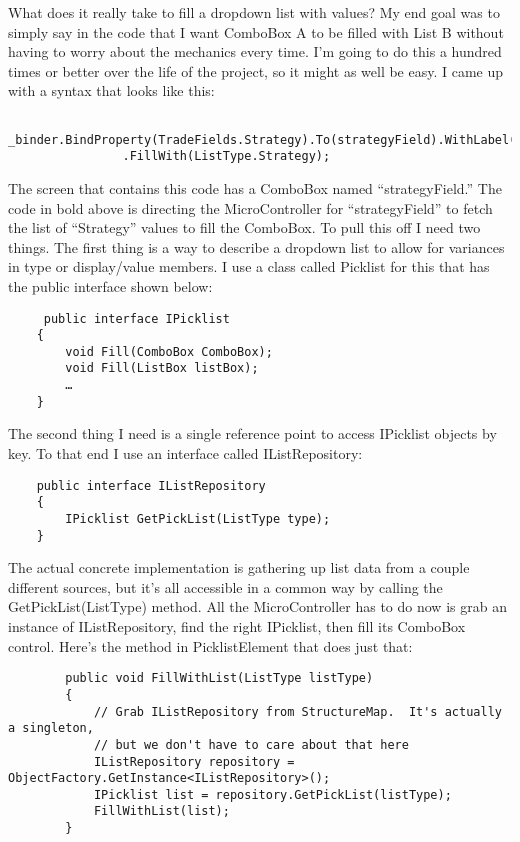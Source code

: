 \documentclass{article}
\begin{document}
{What does it really take to fill a dropdown list with values?  My end goal was to simply say in the code that I want ComboBox A to be filled with List B without having to worry about the mechanics every time.  I'm going to do this a hundred times or better over the life of the project, so it might as well be easy.  I came up with a syntax that looks like this:
\begin{lstlisting}
            _binder.BindProperty(TradeFields.Strategy).To(strategyField).WithLabel(strategyLabel)
                .FillWith(ListType.Strategy);
\end{lstlisting}
The screen that contains this code has a ComboBox named “strategyField.”  The code in bold above is directing the MicroController for “strategyField” to fetch the list of “Strategy” values to fill the ComboBox.  To pull this off I need two things.  The first thing is a way to describe a dropdown list to allow for variances in type or display/value members.  I use a class called Picklist for this that has the public interface shown below:
\begin{lstlisting}
     public interface IPicklist
    {
        void Fill(ComboBox ComboBox);
        void Fill(ListBox listBox);
        …
    }
\end{lstlisting}

The second thing I need is a single reference point to access IPicklist objects by key.  To that end I use an interface called IListRepository:
\begin{lstlisting}
    public interface IListRepository
    {
        IPicklist GetPickList(ListType type);
    }
\end{lstlisting}	

The actual concrete implementation is gathering up list data from a couple different sources, but it's all accessible in a common way by calling the GetPickList(ListType) method.  All the MicroController has to do now is grab an instance of IListRepository, find the right IPicklist, then fill its ComboBox control.  Here's the method in PicklistElement that does just that:
\begin{lstlisting}
        public void FillWithList(ListType listType)
        {
            // Grab IListRepository from StructureMap.  It's actually a singleton,
            // but we don't have to care about that here
            IListRepository repository = ObjectFactory.GetInstance<IListRepository>();
            IPicklist list = repository.GetPickList(listType);
            FillWithList(list);
        }
\end{lstlisting}

}
\end{document}
